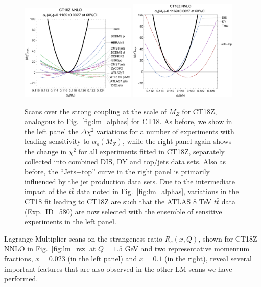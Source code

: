 %
%
\begin{figure}[htbp]
\centering
\includegraphics[width=0.49\textwidth]{./fig/alphas_scanTct18z_pjb05b.pdf}\quad
\includegraphics[width=0.46\textwidth]{./fig/alphas_scanTct18z_pjb05b2.pdf}\quad
\caption{Scans over the strong coupling at the scale of $M_Z$ for CT18Z,
	analogous to Fig.~\ref{fig:lm_alphas} for CT18. As before, we show in the left panel
	the $\Delta \chi^2$ variations for a number of experiments with leading sensitivity
	to $\alpha_s(M_Z)$, while the right panel again shows the change in $\chi^2$ for all experiments
    fitted in CT18Z, separately collected into combined DIS, DY and top/jets data sets. Also as before,
    the ``Jets+top'' curve in the right panel is primarily influenced by the jet production data sets. Due to the
    intermediate impact of the $t\bar{t}$ data noted in Fig.~\ref{fig:lm_alphas}, variations in the
    CT18 fit leading to CT18Z are such that the ATLAS 8 TeV $t\bar{t}$ data (Exp.~ID=580) are now
    selected with the ensemble of sensitive experiments in the left panel.
\label{fig:lm_alphasz}}
\end{figure}

Lagrange Multiplier scans on the strangeness ratio $R_s(x,Q)$, shown
for CT18Z NNLO in Fig.~\ref{fig:lm_rsz} at $Q\!=\!1.5$ GeV and two
representative momentum fractions, 
$x\!=\!0.023$ (in the left panel) and $x\!=\!0.1$ (in the right),
reveal several important features that are also observed in the other
LM scans we have performed. 

